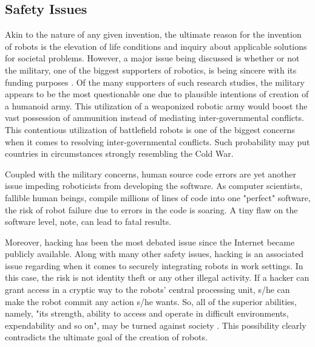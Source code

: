 \documentclass[man]{apa6}
\begin{document}
\subsection{Safety Issues}
Akin to the nature of any given invention, the ultimate reason for the invention of robots is the elevation of life conditions and inquiry about applicable solutions for societal problems.
However, a major issue being discussed is whether or not the military, one of the biggest supporters of robotics, is being sincere with its funding purposes \cite{gre}.
Of the many supporters of such research studies, the military appears to be the most questionable one due to plausible intentions of creation of a humanoid army.
This utilization of a weaponized robotic army would boost the vast possession of ammunition instead of mediating inter-governmental conflicts.
This contentious utilization of battlefield robots is one of the biggest concerns when it comes to resolving inter-governmental conflicts.
Such probability may put countries in circumstances strongly resembling the Cold War. \par

Coupled with the military concerns, human source code errors are yet another issue impeding roboticists from developing the software.
As computer scientists, fallible human beings, compile millions of lines of code into one "perfect" software, the risk of robot failure due to errors in the code is soaring.
A tiny flaw on the software level,  note, can lead to fatal results. 

Moreover, hacking has been the most debated issue since the Internet became publicly available.
Along with many other safety issues, hacking is an associated issue regarding when it comes to securely integrating robots in work settings.
In this case, the risk is not identity theft or any other illegal activity. %
If a hacker can grant access in a cryptic way to the robots' central processing unit, s/he can make the robot commit any action s/he wants.
So, all of the superior abilities, namely, "its strength, ability to access and operate in difficult environments, expendability and so on", may be turned against society \cite[p.~945]{lin}.
This possibility clearly contradicts the ultimate goal of the creation of robots.
\end{document}
